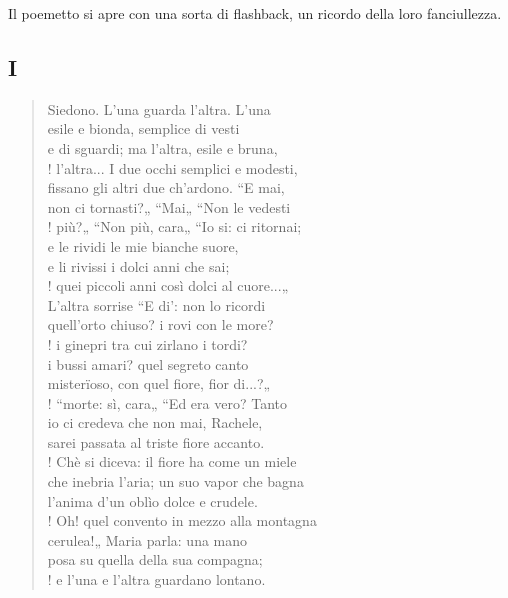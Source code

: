 \documentclass[a4paper, twoside, titlepage]{book}
\newcounter{mar}
\begin{document}
Il poemetto si apre con una sorta di flashback, un ricordo della loro fanciullezza.

\subsection*{I}

\begin{verse}
Siedono. L’una guarda l’altra. L’una\\
esile e bionda, semplice di vesti\\
e di sguardi; ma l’altra, esile e bruna,\\!
l’altra... I due occhi semplici e modesti,\\
fissano gli altri due ch’ardono. “E mai,\\
non ci tornasti?„ “Mai„ “Non le vedesti\\!
più?„ “Non più, cara„ “Io si: ci ritornai;\\
e le rividi le mie bianche suore,\\
e li rivissi i dolci anni che sai;\\!
quei piccoli anni così dolci al cuore...„\\
L’altra sorrise “E di’: non lo ricordi\\
quell’orto chiuso? i rovi con le more?\\!
i ginepri tra cui zirlano i tordi?\\
i bussi amari? quel segreto canto\\
misterïoso, con quel fiore, fior di...?„\\!
“morte: sì, cara„ “Ed era vero? Tanto\\
io ci credeva che non mai, Rachele,\\
sarei passata al triste fiore accanto.\\!
Chè si diceva: il fiore ha come un miele\\
che inebria l’aria; un suo vapor che bagna\\
l’anima d’un oblìo dolce e crudele.\\!
Oh! quel convento in mezzo alla montagna\\
cerulea!„ Maria parla: una mano\\
posa su quella della sua compagna;\\!
e l’una e l’altra guardano lontano.
\end{verse}
\end{document}
